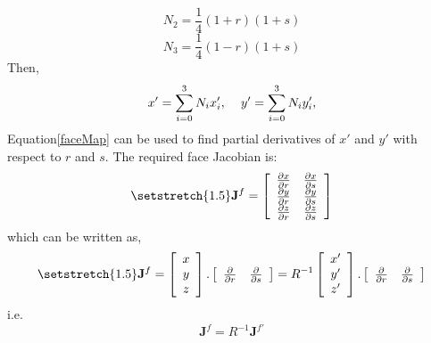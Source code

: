 \begin{equation}\label{shape2f}
	N_2 = \frac{1}{4} (1+r) (1+s)
\end{equation}
\begin{equation}\label{shape3f}
	N_3 = \frac{1}{4} (1-r) (1+s)
\end{equation}
Then,
\begin{equation}\label{faceMap}
	x' = \sum_{i=0}^3 N_i x'_i, \hspace{4mm}y' = \sum_{i=0}^3 N_i y'_i,
\end{equation}
Equation\ref{faceMap} can be used to find partial derivatives of $x'$ and $y'$ with respect to $r$ and $s$.
The required face Jacobian is:
 \begin{equation}\label{method1J}
	 {\setstretch{1.5}
	 \mathbf{J}^f = 
	 \left[\begin{array}{c c}
			 \frac{\partial x}{\partial r}  & \frac{\partial x}{\partial s}  \\
			 \frac{\partial y}{\partial r}  & \frac{\partial y}{\partial s}  \\
			 \frac{\partial z}{\partial r}  & \frac{\partial z}{\partial s}  \\
         \end{array} \right]
 }
 \end{equation}
 which can be written as,
 \begin{equation}\label{method1J}
	 {\setstretch{1.5}
	 \mathbf{J}^f = 
	 \left[\begin{array}{c}
			  x  \\
			  y  \\
			  z  \\
	  \end{array} \right]. 
	  \left[\begin{array}{c c} 
		  \frac{\partial}{\partial r} &  \frac{\partial}{\partial s}\\
		  \end{array} \right]
		  = R^{-1}
	 \left[\begin{array}{c}
			  x'  \\
			  y'  \\
			  z'  \\
	  \end{array} \right]. 
	  \left[\begin{array}{c c} 
		  \frac{\partial}{\partial r} &  \frac{\partial}{\partial s}\\
		  \end{array} \right]
 }
 \end{equation}
i.e.
\begin{equation}\label{method1J1}
	\mathbf{J}^f = R^{-1} \mathbf{J}^{f'}
\end{equation}
